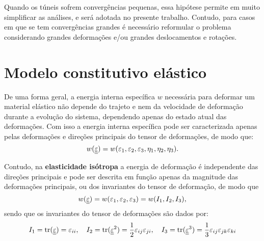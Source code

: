 Quando os túneis sofrem convergências pequenas, essa hipótese permite em muito simplificar as análises, e será adotada no presente trabalho. Contudo, para casos em que se tem convergências grandes é necessário reformular o problema considerando grandes deformações e/ou grandes deslocamentos e rotações.

\section{Modelo constitutivo elástico}

De uma forma geral, a energia interna específica $w$  necessária para deformar um material elástico não depende do trajeto e nem da velocidade de deformação durante a evolução do sistema, dependendo apenas do estado atual das deformações. Com isso a energia interna específica pode ser caracterizada apenas pelas deformações e direções principais do tensor de deformações, de modo que:
\begin{equation}
	\label{eq:energia_interna_elastica}
	w(\underline{\underline \varepsilon}) = w(\varepsilon_1,\varepsilon_2,\varepsilon_3,\eta_1,\eta_2,\eta_3).
\end{equation}

Contudo, na \textbf{elasticidade isótropa} a energia de deformação é independente das direções principais e pode ser descrita em função apenas da magnitude das deformações principais, ou dos invariantes do tensor de deformação, de modo que
\begin{equation}
	\label{eq:energia_interna_elastica_isotropa}
	w(\underline{\underline \varepsilon}) = w(\varepsilon_1,\varepsilon_2,\varepsilon_3) = w(I_1,I_2,I_3),
\end{equation}
sendo que os invariantes do tensor de deformações são dados por:
\begin{equation}
	\label{eq:I1}
	I_1 = \text{tr}(\underline{\underline \varepsilon}) = \varepsilon_{ii},~~~I_2 = \text{tr}(\underline{\underline \varepsilon}^2) = \frac{1}{2} \varepsilon_{ij} \varepsilon_{ji},~~~I_3 = \text{tr}(\underline{\underline \varepsilon}^3) = \frac{1}{3} \varepsilon_{ij} \varepsilon_{jk} \varepsilon_{ki}
\end{equation}


